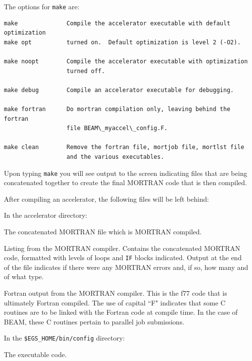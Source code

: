 \documentclass[12pt,twoside]{article}
\begin{document}
The options for {\tt make} are:
\begin{verbatim}
make              Compile the accelerator executable with default optimization
make opt          turned on.  Default optimization is level 2 (-O2).

make noopt        Compile the accelerator executable with optimization
                  turned off.

make debug        Compile an accelerator executable for debugging.

make fortran      Do mortran compilation only, leaving behind the fortran
                  file BEAM\_myaccel\_config.F.

make clean        Remove the fortran file, mortjob file, mortlst file
                  and the various executables.
\end{verbatim}

Upon typing {\tt make} you will see output to the screen indicating files
that are being concatenated together to create the final MORTRAN code
that is then compiled.

After compiling an accelerator, the following files will be left behind:
\begin{description}
\item In the accelerator directory:
\begin{description}
\item[{\tt mortjob.mortran}] The concatenated MORTRAN file which is MORTRAN
compiled.
\item[{\tt BEAM\_myaccel\_config.mortlst}] Listing from the MORTRAN compiler.
Contains the concatenated MORTRAN code, formatted with levels of
loops and {\tt IF} blocks indicated.  Output at the end of the file indicates
if there were any MORTRAN errors and, if so, how many and of what type.
\item[{\tt BEAM\_myaccel\_config.F}] Fortran output from the MORTRAN compiler.
This is the f77 code that is ultimately Fortran compiled.  The use of
capital ``F" indicates that some C routines are to be linked with the
Fortran code at compile time.  In the case of BEAM, these C routines pertain
to parallel job submissions.
\end{description}
\item In the {\tt \$EGS\_HOME/bin/config} directory:
\begin{description}
\item[{\tt BEAM\_myaccel*}] The executable code.
\end{description}
\end{description}
\end{document}
